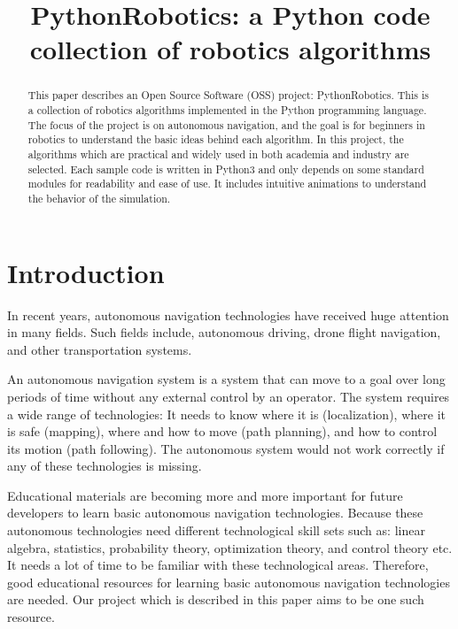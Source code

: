 \documentclass{bmvc2k}
\title{PythonRobotics: a Python code collection of robotics algorithms}
\begin{document}
\maketitle

\begin{abstract}
This paper describes an Open Source Software (OSS) project: PythonRobotics\cite{github}.
This is a collection of robotics algorithms implemented in the Python programming language.
The focus of the project is on autonomous navigation, and the goal is for beginners in robotics to understand the basic ideas behind each algorithm.
In this project, the algorithms which are practical and widely used in both academia and industry are selected.
Each sample code is written in Python3 and only depends on some standard modules for readability and ease of use.
It includes intuitive animations to understand the behavior of the simulation.

\end{abstract}

\section{Introduction}

In recent years, autonomous navigation technologies have received huge attention in many fields. 
Such fields include, autonomous driving\cite{pathplanning}, drone flight navigation, and other transportation systems.

An autonomous navigation system is a system that can move to a goal over long periods of time without any external control by an operator.
The system requires a wide range of technologies:
It needs to know where it is (localization), where it is safe (mapping), where and how to move (path planning), and how to control its motion (path following). 
The autonomous system would not work correctly if any of these technologies is missing.

Educational materials are becoming more and more important for future developers to learn basic autonomous navigation technologies.
Because these autonomous technologies need different technological skill sets such as: linear algebra, statistics, probability theory, optimization theory, and control theory etc. 
It needs a lot of time to be familiar with these technological areas.
Therefore, good educational resources for learning basic autonomous navigation technologies are needed.
Our project which is described in this paper aims to be one such resource.
\end{document}

